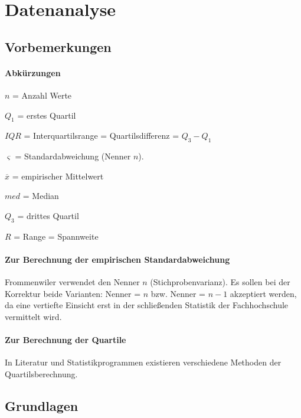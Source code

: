 


\section{Datenanalyse}


\subsection{Vorbemerkungen}
\paragraph{Abkürzungen}

$n$ = Anzahl Werte

$Q_1$ = erstes Quartil

$IQR$ = Interquartilsrange = Quartilsdifferenz = $Q_3 - Q_1$

$\varsigma$ = Standardabweichung (Nenner $n$).

$\overline{x}$ = empirischer Mittelwert

$med$ = Median

$Q_3$ = drittes Quartil

$R$ = Range = Spannweite

\paragraph{Zur Berechnung der empirischen Standardabweichung}
Frommenwiler \cite{frommenwiler17alg} verwendet den Nenner $n$
(Stichprobenvarianz). Es sollen bei der Korrektur beide Varianten:
Nenner = $n$ bzw. Nenner = $n-1$ akzeptiert werden, da eine vertiefte
Einsicht erst in der schließenden Statistik der Fachhochschule
vermittelt wird.

\paragraph{Zur Berechnung der Quartile}
In Literatur und Statistikprogrammen existieren verschiedene Methoden
der Quartilsberechnung.

\subsection{Grundlagen}

